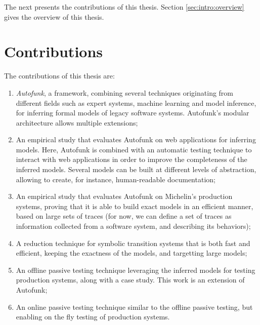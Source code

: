 
The next presents the contributions of this thesis. Section
\ref{sec:intro:overview} gives the overview of this thesis.


\section{Contributions}
\label{sec:intro:contrib}

The contributions of this thesis are:

\begin{enumerate}
    \item \textit{Autofunk}, a framework, combining several
        techniques originating from different fields such as
        expert systems, machine learning and model inference, for
        inferring formal models of legacy software systems.
        Autofunk's modular architecture allows multiple
        extensions;

    \item An empirical study that evaluates Autofunk on web
        applications for inferring models. Here, Autofunk is
        combined with an automatic testing technique to interact
        with web applications in order to improve the
        completeness of the inferred models. Several models can
        be built at different levels of abstraction, allowing to
        create, for instance, human-readable documentation;

    \item An empirical study that evaluates Autofunk on
        Michelin's production systems, proving that it is able to
        build exact models in an efficient manner, based on large
        sets of traces (for now, we can define a set of traces as
        information collected from a software system, and
        describing its behaviors);

    \item A reduction technique for symbolic transition systems
        that is both fast and efficient, keeping the exactness of
        the models, and targetting large models;

    \item An offline passive testing technique leveraging the
        inferred models for testing production systems, along
        with a case study. This work is an extension of Autofunk;

    \item An online passive testing technique similar to the
        offline passive testing, but enabling on the fly testing
        of production systems.
\end{enumerate}

